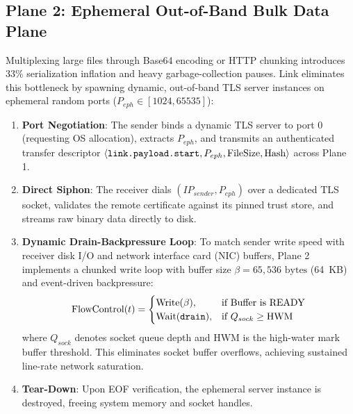 \documentclass[conference]{IEEEtran}
\begin{document}
\subsection{Plane 2: Ephemeral Out-of-Band Bulk Data Plane}
Multiplexing large files through Base64 encoding or HTTP chunking introduces 33\% serialization inflation and heavy garbage-collection pauses. Link eliminates this bottleneck by spawning dynamic, out-of-band TLS server instances on ephemeral random ports ($P_{eph} \in [1024, 65535]$):
\begin{enumerate}
    \item \textbf{Port Negotiation}: The sender binds a dynamic TLS server to port 0 (requesting OS allocation), extracts $P_{eph}$, and transmits an authenticated transfer descriptor $\langle \text{\texttt{link.payload.start}}, P_{eph}, \text{FileSize}, \text{Hash} \rangle$ across Plane 1.
    \item \textbf{Direct Siphon}: The receiver dials $(IP_{sender}, P_{eph})$ over a dedicated TLS socket, validates the remote certificate against its pinned trust store, and streams raw binary data directly to disk.
    \item \textbf{Dynamic Drain-Backpressure Loop}: To match sender write speed with receiver disk I/O and network interface card (NIC) buffers, Plane 2 implements a chunked write loop with buffer size $\beta = 65,536\text{ bytes}$ (64~KB) and event-driven backpressure:
    \begin{equation}
    \text{FlowControl}(t) = \begin{cases} \text{Write}(\beta), & \text{if Buffer is READY} \\ \text{Wait}(\text{\texttt{drain}}), & \text{if } Q_{sock} \ge \text{HWM} \end{cases}
    \end{equation}
    where $Q_{sock}$ denotes socket queue depth and $\text{HWM}$ is the high-water mark buffer threshold. This eliminates socket buffer overflows, achieving sustained line-rate network saturation.
    \item \textbf{Tear-Down}: Upon EOF verification, the ephemeral server instance is destroyed, freeing system memory and socket handles.
\end{enumerate}
\end{document}
